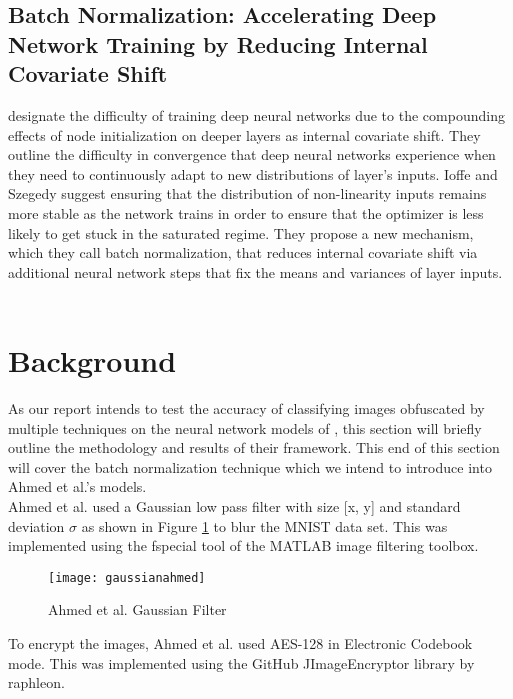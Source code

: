 \documentclass[12pt, titlepage]{article}
\begin{document}
\subsection{Batch Normalization: Accelerating Deep Network Training by Reducing Internal Covariate Shift}

\cite{ioffe2015batch} designate the difficulty of training deep neural networks due to the compounding effects of node initialization on deeper layers as internal covariate shift. They outline the difficulty in convergence that deep neural networks experience when they need to continuously adapt to new distributions of layer's inputs. Ioffe and Szegedy suggest ensuring that the distribution of non-linearity inputs remains more stable as the network trains in order to ensure that the optimizer is less likely to get stuck in the saturated regime. They propose a new mechanism, which they call batch normalization, that reduces internal covariate shift via additional neural network steps that fix the means and variances of layer inputs.\\

~\newpage
\section{Background}\label{Background}

\noindent As our report intends to test the accuracy of classifying images obfuscated by multiple techniques on the neural network models of \cite{ahmed2018obfuscated}, this section will briefly outline the methodology and results of their framework. This end of this section will cover the batch normalization technique which we intend to introduce into Ahmed et al.'s models. \\

\noindent Ahmed et al. used a Gaussian low pass filter with size [x, y] and standard deviation $\sigma$ as shown in Figure \ref{gaussianahmed} to blur the MNIST data set. This was implemented using the fspecial tool of the MATLAB image filtering toolbox. \\

\begin{figure}[h!]
	\begin{center}
		\texttt{[image: gaussianahmed]}
		\caption{Ahmed et al. Gaussian Filter}
		\label{gaussianahmed}
	\end{center}
\end{figure}

\noindent To encrypt the images, Ahmed et al. used AES-128 in Electronic Codebook mode. This was implemented using the GitHub JImageEncryptor library by raphleon.\\ 
\end{document}
